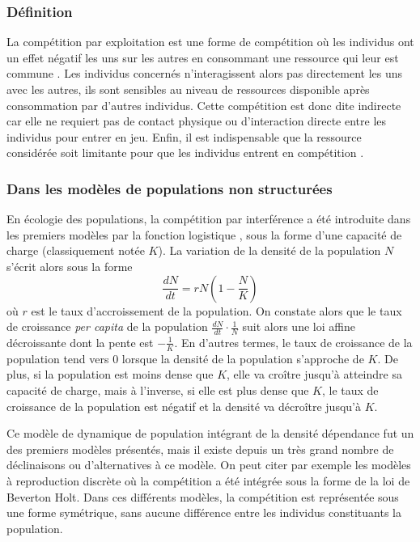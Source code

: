\subsubsection{Définition}


La compétition par exploitation est une forme de compétition où les
individus ont un effet négatif les uns sur les autres en consommant une
ressource qui leur est commune \autocites{goss-custard1980a,
vance1984a, begon2009a}. Les individus concernés n'interagissent alors pas directement les
uns avec les autres, ils sont sensibles au niveau de ressources
disponible après consommation par d'autres individus. Cette compétition est
donc dite indirecte car elle ne requiert pas de contact physique ou
d'interaction directe entre les individus pour entrer en jeu. Enfin, il est
indispensable que la ressource considérée soit limitante pour que les individus
entrent en compétition \autocites{begon2009a}. 

\subsubsection{Dans les modèles de populations non structurées}

En écologie des populations, la compétition par interférence a été introduite 
dans les premiers modèles par la fonction logistique
\autocites{verhulst1838a}, sous la forme d'une capacité de charge (classiquement notée $K$). La variation
de la densité de la population $N$ s'écrit alors sous la forme
$$\frac{dN}{dt}=rN \left(1-\frac{N}{K}\right)$$ où $r$ est le taux
d'accroissement de la population. On constate alors que le taux de croissance
\textit{per capita} de la population $\frac{dN}{dt}\cdot \frac{1}{N}$ suit alors
une loi affine décroissante dont la pente est $-\frac{1}{K}$. En d'autres termes, le
taux de croissance de la population tend vers 0 lorsque la densité de la
population s'approche de $K$. De plus, si la population est moins dense que $K$,
elle va croître jusqu'à atteindre sa capacité de charge, mais à l'inverse, si
elle est plus dense que $K$, le taux de croissance de la population est négatif
et la densité va décroître jusqu'à $K$.

Ce modèle de dynamique de population intégrant de la densité dépendance fut un
des premiers modèles présentés, mais il existe depuis un très grand nombre de
déclinaisons ou d'alternatives à ce modèle. On peut citer par exemple les
modèles à reproduction discrète où la compétition a été intégrée sous la forme
de la loi de Beverton Holt. Dans ces différents modèles, la compétition est
représentée sous une forme symétrique, sans aucune différence entre les
individus constituants la population. 

